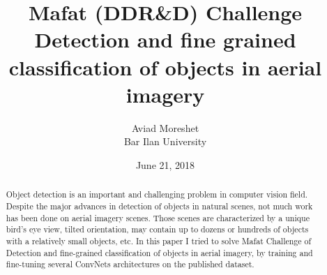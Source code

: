 \documentclass[]{article}
\title{Mafat (DDR\&D) Challenge\\
	Detection and fine grained classification of objects in aerial imagery
	}
\author{Aviad Moreshet\\Bar Ilan University}
\begin{document}
\date{June 21, 2018}
\maketitle
\begin{abstract}
Object detection is an important and challenging problem in computer vision field. Despite the major advances in detection of objects in natural scenes, not much work has been done on aerial imagery scenes. Those scenes are characterized by a unique bird's eye view, tilted orientation, may contain up to dozens or hundreds of objects with a relatively small objects, etc.
In this paper I tried to solve Mafat Challenge of Detection and fine-grained classification of objects in aerial imagery, by training and fine-tuning several ConvNets architectures on the published dataset.

\end{abstract}
\end{document}
